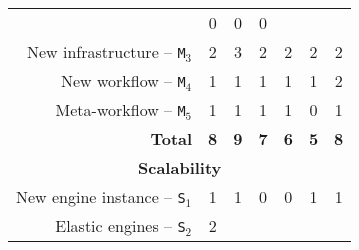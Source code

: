 \documentclass[preprint,3p,twocolumn]{elsarticle}
\begin{document}
\begin{table*}
\begin{tabular}{rcccccc}
                                     & \cellcolor[HTML]{99FF99}0
                                     & \cellcolor[HTML]{99FF99}0
                                     & \cellcolor[HTML]{99FF99}0 \\
New infrastructure -- \texttt{M$_3$} & \cellcolor[HTML]{99FF99}2
                                     & \cellcolor[HTML]{99FF99}3
                                     & \cellcolor[HTML]{99FF99}2
                                     & \cellcolor[HTML]{99FF99}2
                                     & \cellcolor[HTML]{99FF99}2
                                     & \cellcolor[HTML]{99FF99}2 \\
New workflow -- \texttt{M$_4$}       & \cellcolor[HTML]{99FF99}1
                                     & \cellcolor[HTML]{99FF99}1
                                     & \cellcolor[HTML]{99FF99}1
                                     & \cellcolor[HTML]{99FF99}1
                                     & \cellcolor[HTML]{99FF99}1
                                     & \cellcolor[HTML]{99AA99}2 \\
Meta-workflow  -- \texttt{M$_5$}     & \cellcolor[HTML]{99AA99}1
                                     & \cellcolor[HTML]{99AA99}1  
                                     & \cellcolor[HTML]{99AA99}1
                                     & \cellcolor[HTML]{99AA99}1
                                     & \cellcolor[HTML]{99FF99}0
                                     & \cellcolor[HTML]{99AA99}1 \\
\textbf{Total}                       & \cellcolor[HTML]{99AA99}\textbf{8}
                                     & \cellcolor[HTML]{99EE99}\textbf{9}
                                     & \cellcolor[HTML]{99FF99}\textbf{7}
                                     & \cellcolor[HTML]{99EE99}\textbf{6}
                                     & \cellcolor[HTML]{99FF99}\textbf{5}
                                     & \cellcolor[HTML]{99AA99}\textbf{8} \\
\multicolumn{7}{c}{\cellcolor[HTML]{EEEEEE}\textbf{Scalability}}\\
New engine instance -- \texttt{S$_1$}& \cellcolor[HTML]{99AA99}1
                                     & \cellcolor[HTML]{99AA99}1
                                     & \cellcolor[HTML]{99FF99}0
                                     & \cellcolor[HTML]{99FF99}0
                                     & \cellcolor[HTML]{99AA99}1
                                     & \cellcolor[HTML]{99AA99}1 \\
Elastic engines -- \texttt{S$_2$}    & \cellcolor[HTML]{99AA99}2

\end{tabular}
\end{table*}
\end{document}
